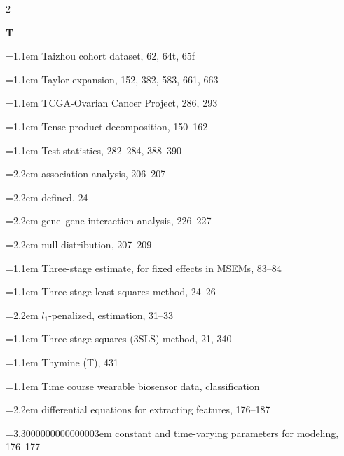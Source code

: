 \begin{multicols}{2}
\par{}\medskip\noindent\textbf{T}\par\nobreak\smallskip\nobreak
\noindent\hangindent=1.1em Taizhou cohort dataset, 62, 64t, 65f\par
\noindent\hangindent=1.1em Taylor expansion, 152, 382, 583, 661, 663\par
\noindent\hangindent=1.1em TCGA-Ovarian Cancer Project, 286, 293\par
\noindent\hangindent=1.1em Tense product decomposition, 150--162\par
\noindent\hangindent=1.1em Test statistics, 282--284, 388--390\par
\noindent\hangindent=2.2em \hspace*{1.1em}association analysis, 206--207\par
\noindent\hangindent=2.2em \hspace*{1.1em}defined, 24\par
\noindent\hangindent=2.2em \hspace*{1.1em}gene--gene interaction analysis, 226--227\par
\noindent\hangindent=2.2em \hspace*{1.1em}null distribution, 207--209\par
\noindent\hangindent=1.1em Three-stage estimate, for fixed effects in MSEMs, 83--84\par
\noindent\hangindent=1.1em Three-stage least squares method, 24--26\par
\noindent\hangindent=2.2em \hspace*{1.1em}$l_{1}$-penalized, estimation, 31--33\par
\noindent\hangindent=1.1em Three stage squares (3SLS) method, 21, 340\par
\noindent\hangindent=1.1em Thymine (T), 431\par
\noindent\hangindent=1.1em Time course wearable biosensor data, classification\par
\noindent\hangindent=2.2em \hspace*{1.1em}differential equations for extracting features, 176--187\par
\noindent\hangindent=3.3000000000000003em \hspace*{2.2em}constant and time-varying parameters for modeling, 176--177\par

\end{multicols}

